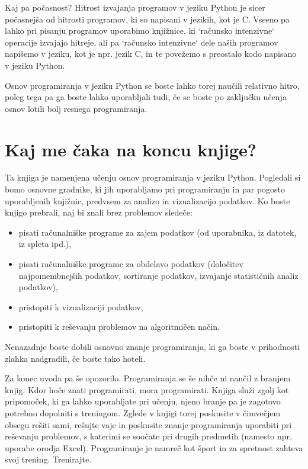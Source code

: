 Kaj pa počasnost? Hitrost izvajanja programov v jeziku Python je sicer počasnejša od hitrosti programov, ki so napisani v jezikih, kot je C. Vseeno pa lahko pri pisanju programov uporabimo knjižnice, ki `računsko intenzivne` operacije izvajajo hitreje, ali pa `računsko intenzivne` dele naših programov napišemo v jeziku, kot je npr. jezik C, in te povežemo s preostalo kodo napisano v jeziku Python.

Osnov programiranja v jeziku Python se boste lahko torej naučili relativno hitro, poleg tega pa ga boste lahko uporabljali tudi, če se boste po zaključku učenja osnov lotili bolj resnega programiranja. 

\section{Kaj me čaka na koncu knjige?} 

Ta knjiga je namenjena učenju osnov programiranja v jeziku Python. Pogledali si bomo osnovne gradnike, ki jih uporabljamo pri programiranju in par pogosto uporabljenih knjižnic, predvsem za analizo in vizualizacijo podatkov. Ko boste knjigo prebrali, naj bi znali brez problemov sledeče:
\begin{itemize}
    \item pisati računalniške programe za zajem podatkov (od uporabnika, iz datotek, iz spleta ipd.),
    \item pisati računalniške programe za obdelavo podatkov (določitev najpomembnejših podatkov, sortiranje podatkov, izvajanje statističnih analiz podatkov),
    \item pristopiti k vizualizaciji podatkov,
    \item pristopiti k reševanju problemov na algoritmičen način.
\end{itemize}
Nenazadnje boste dobili osnovno znanje programiranja, ki ga boste v prihodnosti zlahka nadgradili, če boste tako hoteli.

Za konec uvoda pa še opozorilo. Programiranja se še nihče ni naučil z branjem knjig. Kdor hoče znati programirati, mora programirati. Knjiga služi zgolj kot pripomoček, ki ga lahko uporabljate pri učenju, njeno branje pa je zagotovo potrebno dopolniti s treningom. Zglede v knjigi torej poskusite v čimvečjem obsegu rešiti sami, rešujte vaje in poskusite znanje programiranja uporabiti pri reševanju problemov, s katerimi se soočate pri drugih predmetih (namesto npr. uporabe orodja Excel). Programiranje je namreč kot šport in za spretnost zahteva svoj trening. Trenirajte.

